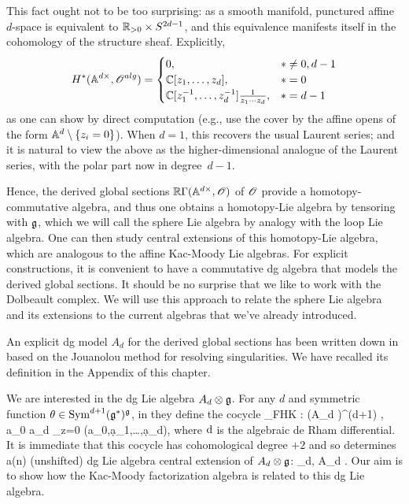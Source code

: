 \documentclass[10pt]{amsart}
\begin{document}
This fact ought not to be too surprising: 
as a smooth manifold, punctured affine $d$-space is equivalent to $\RR_{> 0} \times S^{2d-1}$,
and this equivalence manifests itself in the cohomology of the structure sheaf.
Explicitly,
\[
H^*(\AA^{d\times}, \sO^{alg}) = 
\begin{cases} 0, & * \neq 0, d-1 \\ \CC[z_1,\ldots,z_d], & * = 0 \\ \CC[z_1^{-1},\ldots,z_d^{-1}] \frac{1}{z_1 \cdots z_d}, & * = d-1 \end{cases}
\]
as one can show by direct computation (e.g., use the cover by the affine opens of the form $\AA^d \setminus \{z_i =0\}$).
When $d = 1$, this recovers the usual Laurent series;
and it is natural to view the above as the higher-dimensional analogue of the Laurent series,
with the polar part now in degree~$d-1$.

Hence, the derived global sections $\RR\Gamma(\AA^{d\times},\sO)$ of $\sO$ provide a homotopy-commutative algebra,
and thus one obtains a homotopy-Lie algebra by tensoring with $\fg$,
which we will call the sphere Lie algebra by analogy with the loop Lie algebra.
One can then study central extensions of this homotopy-Lie algebra, which are analogous to the affine Kac-Moody Lie algebras.
For explicit constructions, it is convenient to have a commutative dg algebra that models the derived global sections.
It should be no surprise that we like to work with the Dolbeault complex.
We will use this approach to relate the sphere Lie algebra and its extensions to the current algebras that we've already introduced.

An explicit dg model $A_d$ for the derived global sections has been written down in \cite{FHK} based on the Jouanolou method for resolving singularities. 
We have recalled its definition in the Appendix of this chapter.

We are interested in the dg Lie algebra $A_d \tensor \fg$. 
For any $d$ and symmetric function $\theta \in \Sym^{d+1}(\fg^*)^\fg$, in \cite{FHK} they define the cocycle
\ben
\theta_{FHK} : (A_d \tensor \fg)^{\tensor (d+1)} \to \CC \;\; , \;\; a_0 \cdots a_d \mapsto \Res_{z=0} \theta(a_0,\d a_1,\ldots,\d a_d),
\een
where $\d$ is the algebraic de Rham differential.
It is immediate that this cocycle has cohomological degree $+2$ and so determines a(n) (unshifted) dg Lie algebra central extension of $A_d \tensor \fg$:
\be\label{gdt}
\CC \to \Hat{\fg}_{d, \theta} \to A_d \tensor \fg .
\ee
Our aim is to show how the Kac-Moody factorization algebra is related to this dg Lie algebra. 
\end{document}
